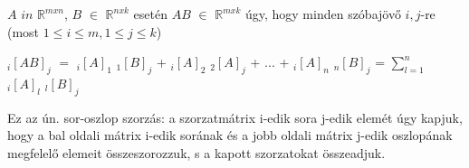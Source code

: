 	
	
	\begin{frame}

		\begin{tcolorbox}[title={Def.: Mátrixszorzás}]	
	$A$ $in$ $\mathbb{R}^{m x n}$, $B$ $\in$ $\mathbb{R}^{n x k}$ esetén $AB$ $\in$ $\mathbb{R}^{m x k}$ úgy, hogy minden szóbajövő $i, j$-re (most $1 \leq i \leq m, 1 \leq j \leq k$)
\mmedskip
	
$_{i} [AB]_j$ $=$ $_{i} [A]_1$ $_{1} [B]_j$ + $_{i} [A]_2$ $_{2} [A]_j$ + $...$ + $_{i} [A]_n$ $_{n} [B]_j$ = $\sum_{l = 1}^n$ $_{i} [A]_l$ $_{l} [B]_j$
\mmedskip

Ez az ún. sor-oszlop szorzás: a szorzatmátrix i-edik sora j-edik elemét úgy kapjuk, hogy a bal oldali mátrix i-edik sorának és a jobb oldali mátrix j-edik oszlopának megfelelő elemeit összeszorozzuk, s a kapott szorzatokat összeadjuk.
		\end{tcolorbox}		
	
	\end{frame}
	
	
	
	
	
	
	
	
	
	
	
	
	
	
	
	
	
	
	
	
	
	
	
	
	
	
	
	
	
	
	
	
	
	
	
	
	
	
	
	
	
	
	
	
	
	
	
	
	
	
	
